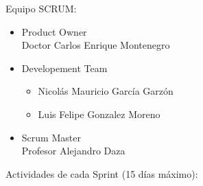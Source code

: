 
Equipo SCRUM:

\begin{itemize}
  \item Product Owner \\
	Doctor Carlos Enrique Montenegro

  \item Developement Team
	\begin{itemize}
	  \item Nicolás Mauricio García Garzón
	  \item Luis Felipe Gonzalez Moreno
	\end{itemize}

  \item Scrum Master \\
	Profesor Alejandro Daza
\end{itemize}

Actividades de cada Sprint (15 días máximo):
  
